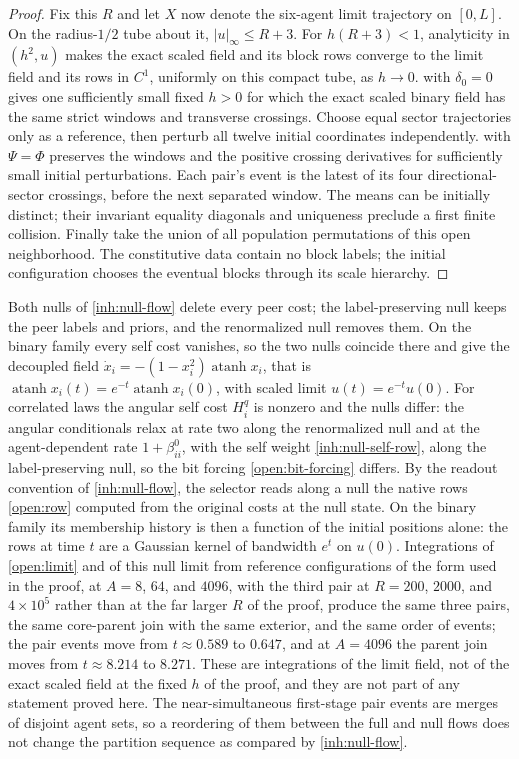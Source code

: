 \begin{proof}
Fix this $R$ and let $X$ now denote the six-agent limit trajectory on $[0,L]$. On the radius-$1/2$ tube about it, $|u|_\infty\le R+3$. For $h(R+3)<1$, analyticity in $(h^2,u)$ makes the exact scaled field and its block rows converge to the limit field and its rows in $C^1$, uniformly on this compact tube, as $h\to0$.  with $\delta_0=0$ gives one sufficiently small fixed $h>0$ for which the exact scaled binary field has the same strict windows and transverse crossings. Choose equal sector trajectories only as a reference, then perturb all twelve initial coordinates independently.  with $\Psi=\Phi$ preserves the windows and the positive crossing derivatives for sufficiently small initial perturbations. Each pair's event is the latest of its four directional-sector crossings, before the next separated window. The means can be initially distinct; their invariant equality diagonals and uniqueness preclude a first finite collision. Finally take the union of all population permutations of this open neighborhood. The constitutive data contain no block labels; the initial configuration chooses the eventual blocks through its scale hierarchy.
\end{proof}

Both nulls of \cref{inh:null-flow} delete every peer cost; the label-preserving null keeps the peer labels and priors, and the renormalized null removes them. On the binary family every self cost vanishes, so the two nulls coincide there and give the decoupled field $\dot x_i=-(1-x_i^2)\operatorname{atanh}x_i$, that is $\operatorname{atanh}x_i(t)=e^{-t}\operatorname{atanh}x_i(0)$, with scaled limit $u(t)=e^{-t}u(0)$. For correlated laws the angular self cost $H_i^q$ is nonzero and the nulls differ: the angular conditionals relax at rate two along the renormalized null and at the agent-dependent rate $1+\beta^0_{ii}$, with the self weight \cref{inh:null-self-row}, along the label-preserving null, so the bit forcing \cref{open:bit-forcing} differs. By the readout convention of \cref{inh:null-flow}, the selector reads along a null the native rows \cref{open:row} computed from the original costs at the null state. On the binary family its membership history is then a function of the initial positions alone: the rows at time $t$ are a Gaussian kernel of bandwidth $e^t$ on $u(0)$. Integrations of \cref{open:limit} and of this null limit from reference configurations of the form used in the proof, at $A=8$, $64$, and $4096$, with the third pair at $R=200$, $2000$, and $4\times10^5$ rather than at the far larger $R$ of the proof, produce the same three pairs, the same core-parent join with the same exterior, and the same order of events; the pair events move from $t\approx0.589$ to $0.647$, and at $A=4096$ the parent join moves from $t\approx8.214$ to $8.271$. These are integrations of the limit field, not of the exact scaled field at the fixed $h$ of the proof, and they are not part of any statement proved here. The near-simultaneous first-stage pair events are merges of disjoint agent sets, so a reordering of them between the full and null flows does not change the partition sequence as compared by \cref{inh:null-flow}.

